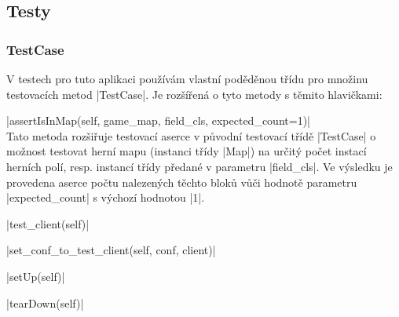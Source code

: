 \subsection{Testy}

\subsubsection{TestCase}

V testech pro tuto aplikaci používám vlastní poděděnou třídu pro množinu testovacích metod \ic|TestCase|. Je rozšířená o tyto metody s těmito hlavičkami:
\begin{description}
	\item \ic|assertIsInMap(self, game_map, field_cls, expected_count=1)| \\
	Tato metoda rozšiřuje testovací aserce v původní testovací třídě \ic|TestCase| o možnost testovat herní mapu (instanci třídy \ic|Map|) na určitý počet instací herních polí, resp. instancí třídy předané v parametru \ic|field_cls|. Ve výsledku je provedena aserce počtu nalezených těchto bloků vůči hodnotě parametru \ic|expected_count| s výchozí hodnotou \ic|1|.
	
    \item \ic|test_client(self)| \\

    \item \ic|set_conf_to_test_client(self, conf, client)| \\

    \item \ic|setUp(self)| \\

    \item \ic|tearDown(self)| \\

\end{description}